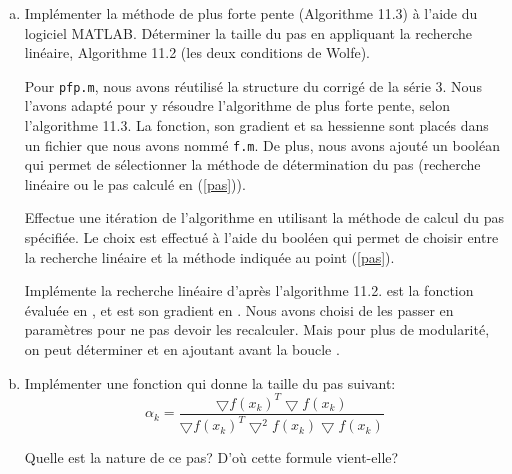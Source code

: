 \documentclass[11pt,a4paper,twoside,onecolumn,titlepage]{report}
\begin{document}
\begin{enumerate}[(a)]
\item\label{pfp} Implémenter la méthode de plus forte pente (Algorithme 11.3) à l'aide du logiciel MATLAB. Déterminer la taille du pas en appliquant la recherche linéaire, Algorithme 11.2 (les deux conditions de Wolfe).

%
%

Pour \texttt{pfp.m}, nous avons réutilisé la structure du corrigé de la série 3. Nous l'avons adapté pour y résoudre l'algorithme de plus forte pente, selon l'algorithme 11.3. La fonction, son gradient et sa hessienne sont placés dans un fichier que nous avons nommé \texttt{f.m}. De plus, nous avons ajouté un booléan  qui permet de sélectionner la méthode de détermination du pas (recherche linéaire ou le pas calculé en (\ref{pas})).



Effectue une itération de l'algorithme en utilisant la méthode de calcul du pas spécifiée. Le choix est effectué à l'aide du booléen  qui permet de choisir entre la recherche linéaire et la méthode indiquée au point (\ref{pas}).



Implémente la recherche linéaire d'après l'algorithme 11.2.  est la fonction évaluée en , et  est son gradient en . Nous avons choisi de les passer en paramètres pour ne pas devoir les recalculer. Mais pour plus de modularité, on peut déterminer  et  en ajoutant  avant la boucle .



%
%
%


\item\label{pas} Implémenter une fonction qui donne la taille du pas suivant:
\begin{equation}\label{eq:cauchy}
\alpha_k = \frac{\bigtriangledown f(x_k)^T \bigtriangledown f(x_k)}{\bigtriangledown f(x_k)^T \bigtriangledown^2 f(x_k) \bigtriangledown f(x_k)}
\end{equation}

Quelle est la nature de ce pas? D'où cette formule vient-elle?

%
%




\end{enumerate}
\end{document}
